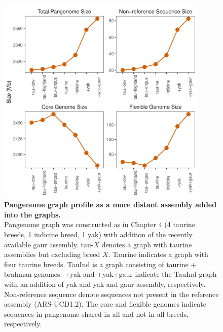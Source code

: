 \documentclass[../main.tex]{subfiles}
\begin{document}
\begin{figure}[!htb]
   \centering
   \includegraphics[width=0.9\textwidth]{discuss/fig51.pdf}
       \vspace{3mm}
       \caption[Pangenome graph profile as a more distant assembly added into the graphs]{\textbf{Pangenome graph profile as a more distant assembly added into the graphs.} \\
       \footnotesize{Pangenome graph was constructed as in Chapter 4 (4 taurine breeds, 1 indicine breed, 1 yak) with addition of the recently available gaur assembly. tau-$X$ denotes a graph with taurine assemblies but excluding breed $X$. Taurine indicates a graph with four taurine breeds. TauInd is a graph consisting of taurine + brahman genomes. +yak and +yak+gaur indicate the TauInd graph with an addition of yak and yak and gaur assembly, respectively. Non-reference sequence denote sequences not present in the reference assembly (ARS-UCD1.2). 
       The core and flexible genomes indicate sequences in pangenome shared in all and not in all breeds, respectively.
       }}
       \label{fig51:panchang}
\end{figure}
\end{document}
